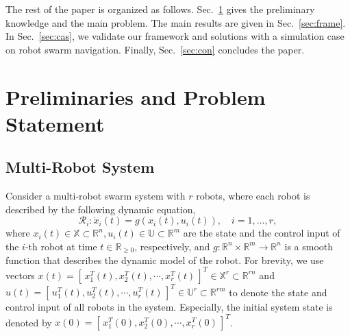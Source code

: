 \documentclass[letterpaper, 10 pt, conference]{ieeeconf}
\begin{document}
The rest of the paper is organized as follows. Sec.~\ref{sec:fps} gives the preliminary knowledge and %
the main problem. %
The main results are given in Sec.~\ref{sec:frame}.%
In Sec.~\ref{sec:cas}, we validate our framework and solutions with a simulation case on robot swarm navigation. Finally, Sec.~\ref{sec:con} concludes the paper.


\section{Preliminaries and Problem Statement}
\label{sec:fps}
%

\subsection{Multi-Robot System}
\label{sec:mrs}
Consider a multi-robot swarm system with $r $ %
robots, where each robot is described by  the following dynamic equation,
\begin{equation}
\mathcal{R}_i: \dot{x}_i(t) = g(x_i(t), u_i(t)), \quad i=1,\ldots,r,
\label{eq:sys_pb}
\end{equation}
where $x_i(t)\!\in\!\mathbb{X}\!\subset\!\mathbb{R}^n, u_i(t)\!\in\!\mathbb{U}\!\subset\!\mathbb{R}^m$ are the state and the control input of the $i$-th robot at time $t\!\in\!\mathbb{R}_{\geq 0}$, respectively, and $g\!:\!\mathbb{R}^n\!\times\!\mathbb{R}^m\!\rightarrow\!\mathbb{R}^n$ is a smooth function that describes the dynamic model of the robot. For brevity, we use vectors $x(t)=[\,x_1^T(t), x_2^T(t), \cdots, x_r^T(t)\,]^T\!\in\!\mathbb{X}^r\!\subset\!\mathbb{R}^{rn} $ and $u(t)=[\,u_1^T(t), u_2^T(t), \cdots, u_r^T(t)\,]^T\!\in\!\mathbb{U}^r\!\subset\!\mathbb{R}^{rm} $ to denote the state and control input of all robots in the system. Especially, the initial system state is denoted by $x(0) = [\,x_1^T(0), x_2^T(0), \cdots, x_r^T(0)\,]^T$.
\end{document}
